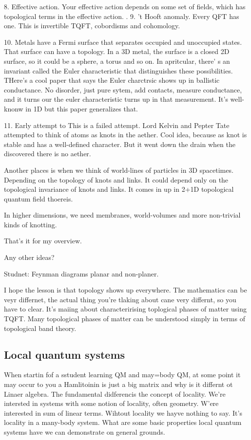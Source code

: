 8. Effective action.
Your effective action depends on some set of fields, which has topological terms
in the effective action.
.
9. 't Hooft anomaly.
Every QFT has one.
This is invertible TQFT, cobordisms and cohomology.

10. 
Metals have a Fermi surface that separates occupied and unoccupied states.
That surface can have a topology.
In a 3D metal, the surface is a closed 2D surface,
so it could be a sphere, a torus and so on.
In apritcular, there' s an invariant called the Euler characteristic that
distinguishes these possibilities.
THere's a cool paper that says the Euler charctrsic shows up in ballistic
conductance.
No disorder, just pure sytem, add contacts, measure conductance, and it turns
our the euler characteristic turns up in that measurement.
It's well-knonw in 1D but this paper generalizes that.

11. Early attempt to 
This is a failed attempt.
Lord Kelvin and Pepter Tate attempted to think of atoms as knots in the aether.
Cool idea, because as knot is stable and has a well-defined character.
But it went down the drain when the discovered there is no aether.

Another places is when we think of world-lines of particles in 3D spacetimes.
Depending on the topology of knots and links.
It could depend only on the topological invariance of knots and links.
It comes in up in 2+1D topological quantum field thoereis.

In higher dimensions, we need membranes, world-volumes and more non-trivial
kinds of knotting.

That's it for my overview.

Any other ideas?

Studnet: Feynman diagrams planar and non-planer.

I hope the lesson is that topology shows up everywhere.
The mathematics can be veyr differnet, the actual thing you're tlaking about
cane very differnt, so you have to clear.
It's maiing about characterirising toplogical phases of matter using TQFT.
Many topological phases of matter can be understood simply in terms of
topological band theory.


\subsection{Local quantum systems}
When startin fof a sstudent learning QM and may=body QM, at some point it may
occur to you a Hamlitoinin is just a big matrix and why is it differnt ot Linaer
algebra.
The fundamental didferencis the concept of locality.
We're intersted in systems with some notion of locality, often geometry.
W'ere interested in sum of linear terms.
Wihtout locality we hayve nothing to say.
It's locality in a many-body system.
What are some basic properties local quantum systems have we can demonstrate on
general grounds.

